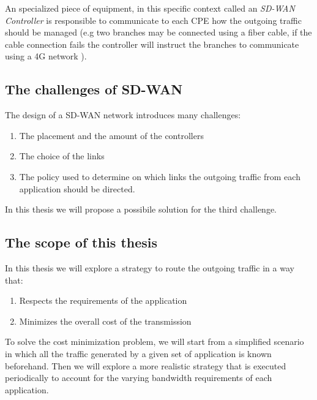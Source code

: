 An specialized piece of equipment, in this specific context called an \textit{SD-WAN Controller} is responsible to communicate to each CPE how the outgoing traffic should be managed (e.g two branches may be connected using a fiber cable, if the cable connection fails the controller will instruct the branches to communicate using a 4G network ).

\subsection{The challenges of SD-WAN}
The design of a SD-WAN network introduces many challenges:
\begin{enumerate}
	\item The placement and the amount of the controllers
	\item The choice of the links
	\item The policy used to determine on which links the outgoing traffic from each application should be directed.
\end{enumerate}
In this thesis we will propose a possibile solution for the third challenge.

\subsection{The scope of this thesis}
In this thesis we will explore a strategy to route the outgoing traffic in a way that:
\begin{enumerate}
	\item Respects the requirements of the application
	\item Minimizes the overall cost of the transmission
\end{enumerate}

To solve the cost minimization problem, we will start from a simplified scenario in which all the traffic generated by a given set of application is known beforehand.
Then we will explore a more realistic strategy that is executed periodically to account for the varying bandwidth requirements of each application.
